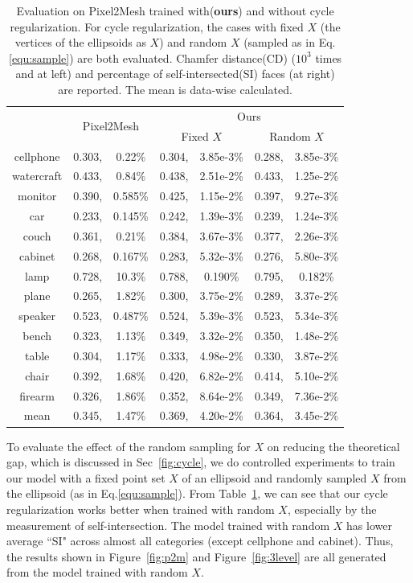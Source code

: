 \begin{table}
	\caption{Evaluation on Pixel2Mesh trained with(\textbf{ours}) and without cycle regularization. For cycle regularization, the cases with fixed $X$ (the vertices of the ellipsoids as $X$) and random $X$ (sampled as in Eq.\ref{equ:sample}) are both evaluated. Chamfer distance(CD) ($10^3$ times and at left) and percentage of self-intersected(SI) faces (at right) are reported. The mean is data-wise calculated.}
	\label{tab:p2m}
	\centering
	\begin{tabular}{|c|rc|rc|rc|}
		\hline
		&\multicolumn{2}{c|}{\multirow{2}{*}{Pixel2Mesh}}&\multicolumn{4}{c|}{Ours}\\
		\cline{4-7}
		~&~&~&\multicolumn{2}{c|}{Fixed $X$}&\multicolumn{2}{c|}{Random $X$}\\
		\hline
		cellphone&0.303,&0.22\%&0.304,&3.85e-3\%&0.288,&3.85e-3\%\\
		watercraft&0.433,&0.84\%&0.438,&2.51e-2\%&0.433,&1.25e-2\%\\
		monitor&0.390,&0.585\%&0.425,&1.15e-2\%&0.397,&9.27e-3\%\\
		car&0.233,&0.145\%&0.242,&1.39e-3\%&0.239,&1.24e-3\%\\
		couch&0.361,&0.21\%&0.384,&3.67e-3\%&0.377,&2.26e-3\%\\
		cabinet&0.268,&0.167\%&0.283,&5.32e-3\%&0.276,&5.80e-3\%\\
		lamp&0.728,&10.3\%&0.788,&0.190\%&0.795,&0.182\%\\
		plane&0.265,&1.82\%&0.300,&3.75e-2\%&0.289,&3.37e-2\%\\
		speaker&0.523,&0.487\%&0.524,&5.39e-3\%&0.523,&5.34e-3\%\\
		bench&0.323,&1.13\%&0.349,&3.32e-2\%&0.350,&1.48e-2\%\\
		table&0.304,&1.17\%&0.333,&4.98e-2\%&0.330,&3.87e-2\%\\
		chair&0.392,&1.68\%&0.420,&6.82e-2\%&0.414,&5.10e-2\%\\
		firearm&0.326,&1.86\%&0.352,&8.64e-2\%&0.349,&7.36e-2\%\\
		\hline
		mean &0.345,&1.47\%&0.369,& 4.20e-2\%&0.364,& 3.45e-2\%\\
		\hline
	\end{tabular}
\end{table}

To evaluate the effect of the random sampling for $X$ on reducing the theoretical gap, which is discussed in Sec~\ref{fig:cycle}, we do controlled experiments to train our model with a fixed point set $X$ of an ellipsoid and randomly sampled $X$ from the ellipsoid (as in Eq.\ref{equ:sample}). From Table~\ref{tab:p2m}, we can see that our cycle regularization works better when trained with random $X$, especially by the measurement of self-intersection. The model trained with random $X$ has lower average ``SI" across almost all categories (except cellphone and cabinet). Thus, the results shown in Figure~\ref{fig:p2m} and Figure~\ref{fig:3level} are all generated from the model trained with random $X$. 


